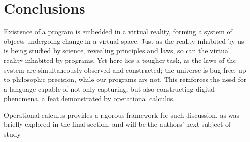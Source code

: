 \documentclass{article}
\begin{document}
     
     \section{Conclusions}
     
     Existence of a program is embedded in a virtual reality, forming a system of objects undergoing change in a virtual space. Just as the reality inhabited by us is being studied by science, revealing principles and laws, so can the virtual reality inhabited by programs. Yet here lies a tougher task, as the laws of the system are simultaneously observed and constructed; the universe is bug-free, up to philosophic precision, while our programs are not. This reinforces the need for a language capable of not only capturing, but also constructing digital phenomena, a feat demonstrated by operational calculus. \cite[Section 8]{OperationalCalculus}
     
     Operational calculus provides a rigorous framework for such discussion, as was briefly explored in the final section, and will be the authors' next subject of study.

\clearpage
  \printbibliography
  
\end{document}
